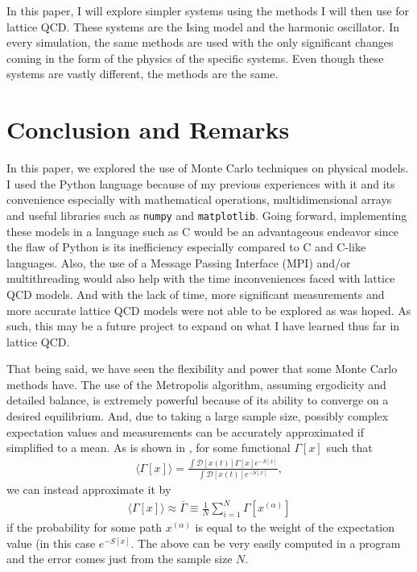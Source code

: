 \documentclass[11pt]{article}
\begin{document}
In this paper, I will explore simpler systems using the methods I will then use for lattice QCD. These systems are the Ising model and the harmonic oscillator. In every simulation, the same methods are used with the only significant changes coming in the form of the physics of the specific systems. Even though these systems are vastly different, the methods are the same.

\section{Conclusion and Remarks}
In this paper, we explored the use of Monte Carlo techniques on physical models. I used the Python language because of my previous experiences with it and its convenience especially with mathematical operations, multidimensional arrays and useful libraries such as \texttt{numpy} and \texttt{matplotlib}. Going forward, implementing these models in a language such as C would be an advantageous endeavor since the flaw of Python is its inefficiency especially compared to C and C-like languages. Also, the use of a Message Passing Interface (MPI) and/or multithreading would also help with the time inconveniences faced with lattice QCD models. And with the lack of time, more significant measurements and more accurate lattice QCD models were not able to be explored as was hoped. As such, this may be a future project to expand on what I have learned thus far in lattice QCD.

That being said, we have seen the flexibility and power that some Monte Carlo methods have. The use of the Metropolis algorithm, assuming ergodicity and detailed balance, is extremely powerful because of its ability to converge on a desired equilibrium. And, due to taking a large sample size, possibly complex expectation values and measurements can be accurately approximated if simplified to a mean. As is shown in \cite{MainPaper}, for some functional $\Gamma[x]$ such that
\begin{align}
	\langle\Gamma[x]\rangle=\frac{\int\mathcal{D}[x(t)]\Gamma[x]e^{-S[x]}}{\int\mathcal{D}[x(t)]e^{-S[x]}},
\end{align}
we can instead approximate it by
\begin{align}
	\langle\Gamma[x]\rangle\approx\overline{\Gamma}\equiv\frac{1}{N}\sum_{i=1}^N\Gamma[x^{(\alpha)}]
\end{align}
if the probability for some path $x^{(\alpha)}$ is equal to the weight of the expectation value (in this case $e^{-S[x]}$. The above can be very easily computed in a program and the error comes just from the sample size $N$.
\end{document}

